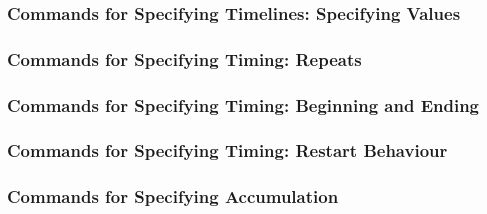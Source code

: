 \subsubsection{Commands for Specifying Timelines: Specifying Values}

\subsubsection{Commands for Specifying Timing: Repeats}

\subsubsection{Commands for Specifying Timing: Beginning and Ending}

\subsubsection{Commands for Specifying Timing: Restart Behaviour}

\subsubsection{Commands for Specifying Accumulation}

\endinput



